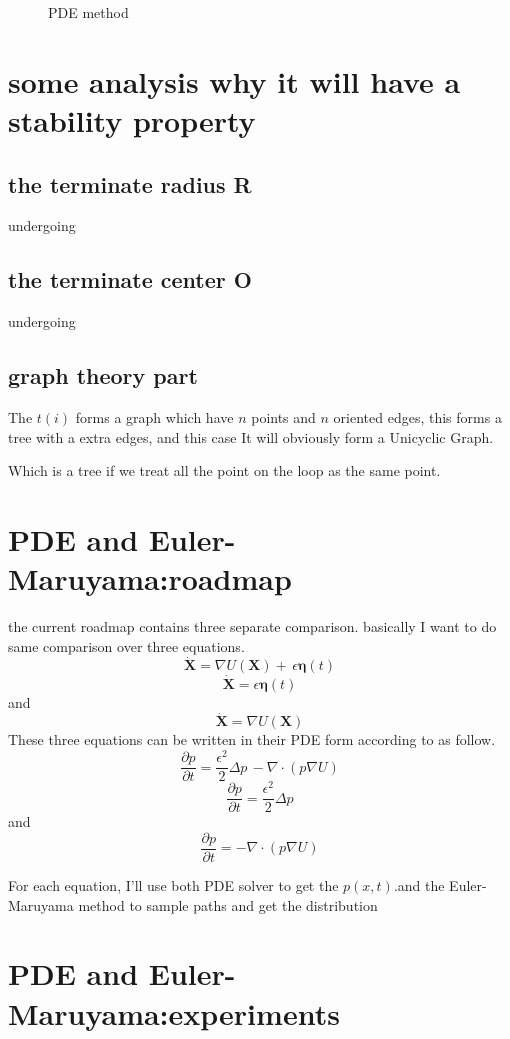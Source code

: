 \documentclass{article}
\theoremstyle{definition} %
\begin{document}
\begin{figure}[ht!]
\begin{minipage}{0.45\textwidth}
        \caption{PDE method}
    \end{minipage}
\end{figure}

\section{some analysis why it will have a stability property}
\subsection{the terminate radius R}
undergoing
\subsection{the terminate center O}
undergoing
\subsection{graph theory part}
The \(t(i)\) forms a graph which have \(n\) points
and \(n\) oriented edges, this forms a tree with a extra
edges, and this case It will obviously form a Unicyclic Graph.

Which is a tree if we treat all the point on the
loop as the same point.


\section{PDE and Euler-Maruyama:roadmap}
the current roadmap contains three separate comparison.
basically I want to do same comparison over three
equations.
\[
    \dot{\mathbf{X}} =  \nabla U(\mathbf{X}) +  \,\epsilon\boldsymbol{\eta}(t)
\]
\[
    \dot{\mathbf{X}} =  \epsilon\boldsymbol{\eta}(t)
\]
and
\[
    \dot{\mathbf{X}} =  \nabla U(\mathbf{X})
\]
These three equations can be written in their
PDE form according to
\cite[Fokker-Planck Equation]{Fokker-Planck}
as follow.
\[
    \frac{\partial p}{\partial t} =  \frac{\epsilon^2}{2}  \Delta p\,-\nabla\cdot(p\nabla U)
\]
\[
    \frac{\partial p}{\partial t} = \frac{\epsilon^2}{2}  \Delta p
\]
and
\[
    \frac{\partial p}{\partial t} =  -\nabla\cdot(p\nabla U)
\]

For each equation, I'll use both PDE solver
to get the \(p(x,t)\).and the Euler-Maruyama method
to sample paths and get the distribution

\section{PDE and Euler-Maruyama:experiments}
\end{document}
